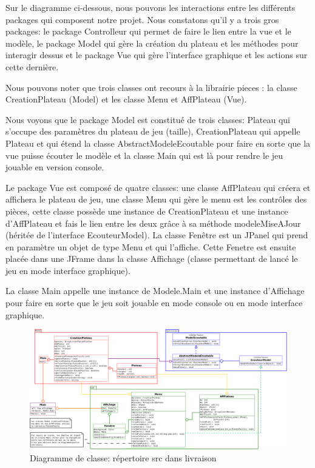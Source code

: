 \documentclass[12pt]{article}
\begin{document}
Sur le diagramme ci-dessous, nous pouvons les interactions entre les différents packages qui composent notre projet. Nous constatons qu'il y a trois gros packages: le package Controlleur qui permet de faire le lien entre la vue et le modèle, le package Model qui gère la création du plateau et les méthodes pour interagir dessus et le package Vue qui gère l'interface graphique et les actions sur cette dernière.

Nous pouvons noter que trois classes ont recours à la librairie pieces :  la classe CreationPlateau (Model) et les classe Menu et AffPlateau (Vue).

Nous voyons que le package Model est constitué de trois classes: Plateau qui s’occupe des paramètres du plateau de jeu (taille), CreationPlateau qui appelle Plateau et qui étend la classe AbstractModeleEcoutable pour faire en sorte que la vue puisse écouter le modèle et la classe Main qui est là pour rendre le jeu jouable en version console.

Le package Vue est composé de quatre classes: une classe AffPlateau qui créera et affichera le plateau de jeu, une classe Menu qui gère le menu est les contrôles des pièces, cette classe possède une instance de CreationPlateau et une instance d'AffPlateau et fais le lien entre les deux grâce à sa méthode modeleMiseAJour (héritée de l'interface EcouteurModel). La classe Fenêtre est un JPanel qui prend en paramètre un objet de type Menu et qui l'affiche. Cette Fenetre est ensuite placée dans une JFrame dans la classe Affichage (classe permettant de lancé le jeu en mode interface graphique).

La classe Main appelle une instance de Modele.Main et une instance d'Affichage pour faire en sorte que le jeu soit jouable en mode console ou en mode interface graphique.

\begin{figure}[h]
\begin{center}
\includegraphics[scale=0.25]{Images/DiagClasse.png}
\end{center}
\caption{Diagramme de classe: répertoire src dans livraison}
\end{figure}
\end{document}
